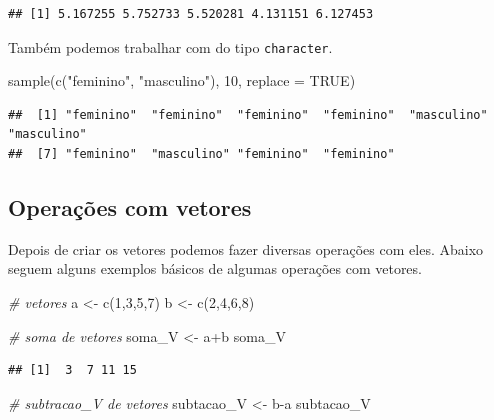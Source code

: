 \documentclass[
]{book}
\newenvironment{Shaded}{\begin{snugshade}}{\end{snugshade}}
\newcommand{\AttributeTok}[1]{\textcolor[rgb]{0.77,0.63,0.00}{#1}}
\newcommand{\CommentTok}[1]{\textcolor[rgb]{0.56,0.35,0.01}{\textit{#1}}}
\newcommand{\ConstantTok}[1]{\textcolor[rgb]{0.00,0.00,0.00}{#1}}
\newcommand{\DecValTok}[1]{\textcolor[rgb]{0.00,0.00,0.81}{#1}}
\newcommand{\FunctionTok}[1]{\textcolor[rgb]{0.00,0.00,0.00}{#1}}
\newcommand{\NormalTok}[1]{#1}
\newcommand{\OtherTok}[1]{\textcolor[rgb]{0.56,0.35,0.01}{#1}}
\newcommand{\SpecialCharTok}[1]{\textcolor[rgb]{0.00,0.00,0.00}{#1}}
\newcommand{\StringTok}[1]{\textcolor[rgb]{0.31,0.60,0.02}{#1}}
\begin{document}
\begin{verbatim}
## [1] 5.167255 5.752733 5.520281 4.131151 6.127453
\end{verbatim}

Também podemos trabalhar com do tipo \texttt{character}.

\begin{Shaded}
\begin{Highlighting}[]
\FunctionTok{sample}\NormalTok{(}\FunctionTok{c}\NormalTok{(}\StringTok{"feminino"}\NormalTok{, }\StringTok{"masculino"}\NormalTok{), }\DecValTok{10}\NormalTok{, }\AttributeTok{replace =} \ConstantTok{TRUE}\NormalTok{)}
\end{Highlighting}
\end{Shaded}

\begin{verbatim}
##  [1] "feminino"  "feminino"  "feminino"  "feminino"  "masculino" "masculino"
##  [7] "feminino"  "masculino" "feminino"  "feminino"
\end{verbatim}

\hypertarget{operauxe7uxf5es-com-vetores}{%
\subsection{Operações com vetores}\label{operauxe7uxf5es-com-vetores}}

Depois de criar os vetores podemos fazer diversas operações com eles. Abaixo seguem alguns exemplos básicos de algumas operações com vetores.

\begin{Shaded}
\begin{Highlighting}[]
\CommentTok{\# vetores}
\NormalTok{a }\OtherTok{\textless{}{-}} \FunctionTok{c}\NormalTok{(}\DecValTok{1}\NormalTok{,}\DecValTok{3}\NormalTok{,}\DecValTok{5}\NormalTok{,}\DecValTok{7}\NormalTok{)}
\NormalTok{b }\OtherTok{\textless{}{-}} \FunctionTok{c}\NormalTok{(}\DecValTok{2}\NormalTok{,}\DecValTok{4}\NormalTok{,}\DecValTok{6}\NormalTok{,}\DecValTok{8}\NormalTok{)}

\CommentTok{\# soma de vetores}
\NormalTok{soma\_V }\OtherTok{\textless{}{-}}\NormalTok{ a}\SpecialCharTok{+}\NormalTok{b}
\NormalTok{soma\_V}
\end{Highlighting}
\end{Shaded}

\begin{verbatim}
## [1]  3  7 11 15
\end{verbatim}

\begin{Shaded}
\begin{Highlighting}[]
\CommentTok{\# subtracao\_V de vetores}
\NormalTok{subtacao\_V }\OtherTok{\textless{}{-}}\NormalTok{ b}\SpecialCharTok{{-}}\NormalTok{a}
\NormalTok{subtacao\_V}
\end{Highlighting}
\end{Shaded}
\end{document}
